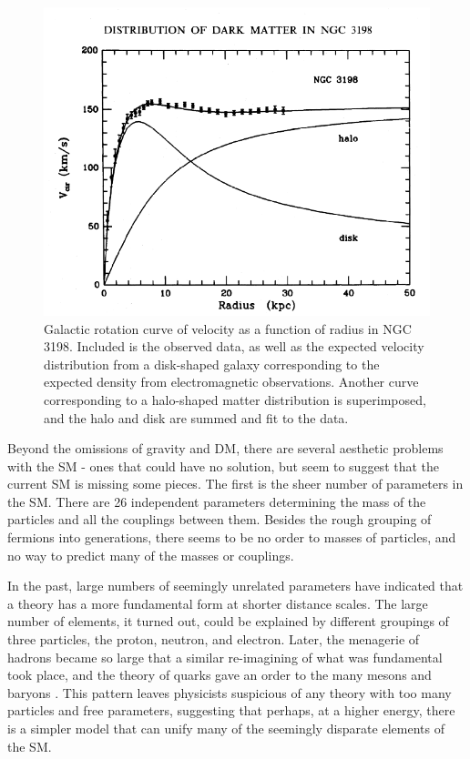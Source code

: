 \begin{centering}
\begin{figure}[bth]
\myfloatalign
\includegraphics[width=.85\linewidth]{figures/theory/rotatioanl_curve_ngc3198_rc.png}
\caption{Galactic rotation curve of velocity as a function of radius in NGC 3198. Included is the observed data, as well as the expected velocity distribution from a disk-shaped galaxy corresponding to the expected density from electromagnetic observations. Another curve corresponding to a halo-shaped matter distribution is superimposed, and the halo and disk are summed and fit to the data. \cite{1985ApJ...295..305V}}
\label{fig:dm_curve}
\end{figure}
\end{centering}

Beyond the omissions of gravity and \ac{DM}, there are several aesthetic problems with the \ac{SM} - ones that could have no solution, but seem to suggest that the current \ac{SM} is missing some pieces. The first is the sheer number of parameters in the \ac{SM}. There are 26 independent parameters determining the mass of the particles and all the couplings between them. Besides the rough grouping of fermions into generations, there seems to be no order to masses of particles, and no way to predict many of the masses or couplings. 

In the past, large numbers of seemingly unrelated parameters have indicated that a theory has a more fundamental form at shorter distance scales. The large number of elements, it turned out, could be explained by different groupings of three particles, the proton, neutron, and electron. Later, the menagerie of hadrons became so large that a similar re-imagining of what was fundamental took place, and the theory of quarks gave an order to the many mesons and baryons \cite{Gell-Mann_1961}. This pattern leaves physicists suspicious of any theory with too many particles and free parameters, suggesting that perhaps, at a higher energy, there is a simpler model that can unify many of the seemingly disparate elements of the \ac{SM}. 

